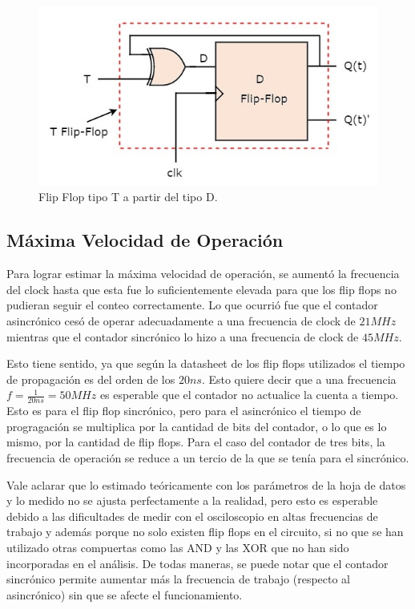 \begin{figure}[H]
\centering
\includegraphics[scale=0.4]{TflipflopWithD.PNG}
\caption{Flip Flop tipo T a partir del tipo D.}
\end{figure}


\subsection{Máxima Velocidad de Operación}

Para lograr estimar la máxima velocidad de operación, se aumentó la
frecuencia del clock hasta que esta fue lo suficientemente elevada
para que los flip flops no pudieran seguir el conteo correctamente.
Lo que ocurrió fue que el contador asincrónico cesó de operar adecuadamente
a una frecuencia de clock de $21MHz$ mientras que el contador sincrónico
lo hizo a una frecuencia de clock de $45MHz$.

Esto tiene sentido, ya que según la datasheet de los flip flops utilizados
el tiempo de propagación es del orden de los $20ns$. Esto quiere
decir que a una frecuencia $f=\frac{1}{20ns}=50MHz$ es esperable
que el contador no actualice la cuenta a tiempo. Esto es para el flip
flop sincrónico, pero para el asincrónico el tiempo de progragación
se multiplica por la cantidad de bits del contador, o lo que es lo
mismo, por la cantidad de flip flops. Para el caso del contador de
tres bits, la frecuencia de operación se reduce a un tercio de la
que se tenía para el sincrónico.\newline

Vale aclarar que lo estimado teóricamente con los parámetros de la
hoja de datos y lo medido no se ajusta perfectamente a la realidad, pero esto es
esperable debido a las dificultades de medir con el osciloscopio en
altas frecuencias de trabajo y además porque no solo existen flip
flops en el circuito, si no que se han utilizado otras compuertas
como las AND y las XOR que no han sido incorporadas en el análisis. De
todas maneras, se puede notar que el contador sincrónico permite aumentar
más la frecuencia de trabajo (respecto al asincrónico)
sin que se afecte el funcionamiento.